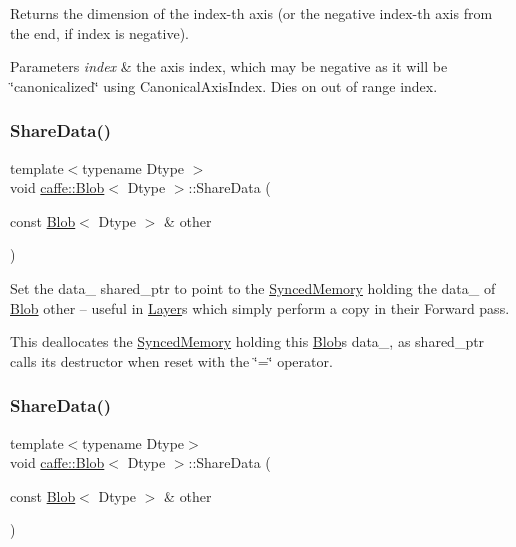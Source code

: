 Returns the dimension of the index-\/th axis (or the negative index-\/th axis from the end, if index is negative). 


\begin{DoxyParams}{Parameters}
{\em index} & the axis index, which may be negative as it will be \char`\"{}canonicalized\char`\"{} using Canonical\+Axis\+Index. Dies on out of range index. \\
\hline
\end{DoxyParams}
\mbox{\label{classcaffe_1_1_blob_a8fce5a816a2b9629686db69108610d93}} 
\subsubsection{\texorpdfstring{Share\+Data()}{ShareData()}\hspace{0.1cm}{\footnotesize\ttfamily [1/2]}}
{\footnotesize\ttfamily template$<$typename Dtype $>$ \\
void \mbox{\hyperlink{classcaffe_1_1_blob}{caffe\+::\+Blob}}$<$ Dtype $>$\+::Share\+Data (\begin{DoxyParamCaption}\item[{const \mbox{\hyperlink{classcaffe_1_1_blob}{Blob}}$<$ Dtype $>$ \&}]{other }\end{DoxyParamCaption})}



Set the data\+\_\+ shared\+\_\+ptr to point to the \mbox{\hyperlink{classcaffe_1_1_synced_memory}{Synced\+Memory}} holding the data\+\_\+ of \mbox{\hyperlink{classcaffe_1_1_blob}{Blob}} other -- useful in \mbox{\hyperlink{classcaffe_1_1_layer}{Layer}}s which simply perform a copy in their Forward pass. 

This deallocates the \mbox{\hyperlink{classcaffe_1_1_synced_memory}{Synced\+Memory}} holding this \mbox{\hyperlink{classcaffe_1_1_blob}{Blob}}\textquotesingle{}s data\+\_\+, as shared\+\_\+ptr calls its destructor when reset with the \char`\"{}=\char`\"{} operator. \mbox{\label{classcaffe_1_1_blob_a8fce5a816a2b9629686db69108610d93}} 
\subsubsection{\texorpdfstring{Share\+Data()}{ShareData()}\hspace{0.1cm}{\footnotesize\ttfamily [2/2]}}
{\footnotesize\ttfamily template$<$typename Dtype$>$ \\
void \mbox{\hyperlink{classcaffe_1_1_blob}{caffe\+::\+Blob}}$<$ Dtype $>$\+::Share\+Data (\begin{DoxyParamCaption}\item[{const \mbox{\hyperlink{classcaffe_1_1_blob}{Blob}}$<$ Dtype $>$ \&}]{other }\end{DoxyParamCaption})}




